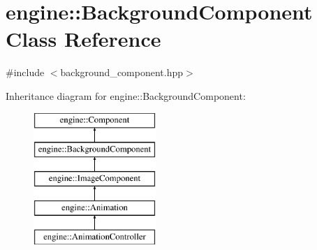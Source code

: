 \hypertarget{classengine_1_1_background_component}{}\section{engine\+:\+:Background\+Component Class Reference}
\label{classengine_1_1_background_component}


{\ttfamily \#include $<$background\+\_\+component.\+hpp$>$}

Inheritance diagram for engine\+:\+:Background\+Component\+:\begin{figure}[H]
\begin{center}
\leavevmode
\includegraphics[height=5.000000cm]{classengine_1_1_background_component}
\end{center}
\end{figure}

